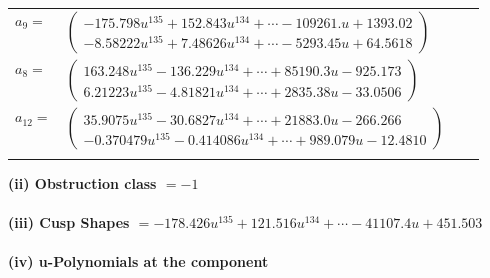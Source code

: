 \documentclass[1p]{elsarticle_modified}
\theoremstyle{definition}
\begin{document}
\begin{tabular}{m{7pt} m{180pt} m{7pt} m{180pt} }
\flushright $a_{9}=$&$\begin{pmatrix}-175.798 u^{135}+152.843 u^{134}+\cdots-109261. u+1393.02\\-8.58222 u^{135}+7.48626 u^{134}+\cdots-5293.45 u+64.5618\end{pmatrix}$ \\
\flushright $a_{8}=$&$\begin{pmatrix}163.248 u^{135}-136.229 u^{134}+\cdots+85190.3 u-925.173\\6.21223 u^{135}-4.81821 u^{134}+\cdots+2835.38 u-33.0506\end{pmatrix}$ \\
\flushright $a_{12}=$&$\begin{pmatrix}35.9075 u^{135}-30.6827 u^{134}+\cdots+21883.0 u-266.266\\-0.370479 u^{135}-0.414086 u^{134}+\cdots+989.079 u-12.4810\end{pmatrix}$\\&\end{tabular}
\flushleft \textbf{(ii) Obstruction class $= -1$}\\~\\
\flushleft \textbf{(iii) Cusp Shapes $= -178.426 u^{135}+121.516 u^{134}+\cdots-41107.4 u+451.503$}\\~\\
\newpage\renewcommand{\arraystretch}{1}
\flushleft \textbf{(iv) u-Polynomials at the component}\newline \\
\end{document}
